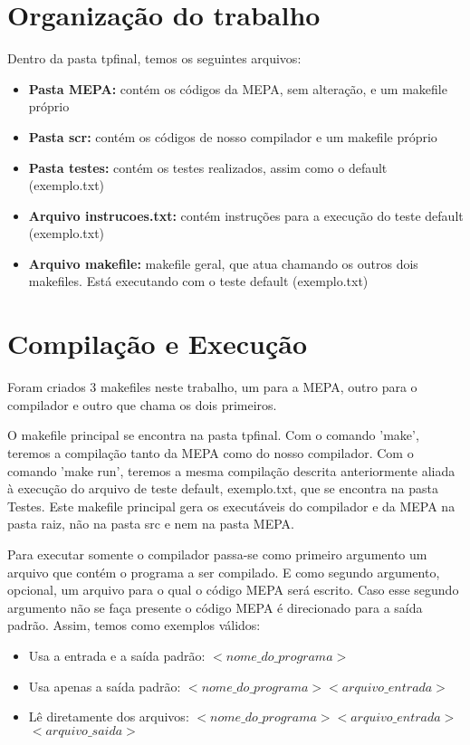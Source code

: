 \documentclass[a4paper,12pt]{article}
\begin{document}
\section{Organização do trabalho}
Dentro da pasta tpfinal, temos os seguintes arquivos:
\begin{itemize}
 \item \textbf{Pasta MEPA:} contém os códigos da MEPA, sem alteração, e um makefile próprio
 \item \textbf{Pasta scr:} contém os códigos de nosso compilador e um makefile próprio
 \item \textbf{Pasta testes:} contém os testes realizados, assim como o default (exemplo.txt)
\item \textbf{Arquivo instrucoes.txt:} contém instruções para a execução do teste default (exemplo.txt)
\item \textbf{Arquivo makefile:} makefile geral, que atua chamando os outros dois makefiles. Está executando com o teste default (exemplo.txt)
\end{itemize}

\section{Compilação e Execução}
Foram criados 3 makefiles neste trabalho, um para a MEPA, outro para o compilador e outro que chama os dois primeiros.

O makefile principal se encontra na pasta tpfinal. Com o comando 'make', teremos a compilação tanto da MEPA como do nosso compilador. Com o comando 'make run', teremos a mesma compilação descrita anteriormente aliada à execução do arquivo de teste default, exemplo.txt, que se encontra na pasta Testes. Este makefile principal gera os executáveis do compilador e da MEPA na pasta raiz, não na pasta src e nem na pasta MEPA.

Para executar somente o compilador passa-se como primeiro argumento um arquivo que contém o programa a ser compilado. E como segundo argumento, opcional, um arquivo para o qual o código MEPA será escrito. Caso esse segundo argumento não se faça presente o código MEPA é direcionado para a saída padrão. Assim, temos como exemplos válidos: 
\begin{itemize}
 \item Usa a entrada e a saída padrão: \textit{$<nome\_do\_programa>$ }
 \item Usa apenas a saída padrão: \textit{$<nome\_do\_programa> <arquivo\_entrada>$}
\item Lê diretamente dos arquivos: \textit{$<nome\_do\_programa> <arquivo\_entrada>$ $<arquivo\_saida>$}
\end{itemize}
\end{document}
